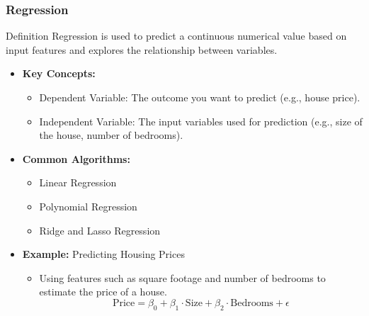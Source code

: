 \documentclass[aspectratio=169]{beamer}
\begin{document}
\begin{frame}[fragile]
    \frametitle{Regression}
    \begin{block}{Definition}
        Regression is used to predict a continuous numerical value based on input features and explores the relationship between variables.
    \end{block}

    \begin{itemize}
        \item \textbf{Key Concepts:}
            \begin{itemize}
                \item Dependent Variable: The outcome you want to predict (e.g., house price).
                \item Independent Variable: The input variables used for prediction (e.g., size of the house, number of bedrooms).
            \end{itemize}
        \item \textbf{Common Algorithms:}
            \begin{itemize}
                \item Linear Regression
                \item Polynomial Regression
                \item Ridge and Lasso Regression
            \end{itemize}
        \item \textbf{Example:} Predicting Housing Prices
            \begin{itemize}
                \item Using features such as square footage and number of bedrooms to estimate the price of a house.
                \begin{equation}
                    \text{Price} = \beta_0 + \beta_1 \cdot \text{Size} + \beta_2 \cdot \text{Bedrooms} + \epsilon
                \end{equation}
            \end{itemize}
    \end{itemize}
\end{frame}
\end{document}
